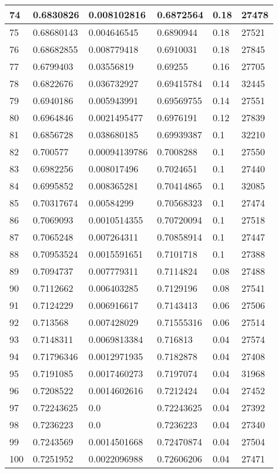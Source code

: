 \begin{longtable}{|l|l|l|l|l|l|}
74 & 0.6830826 & 0.008102816 & 0.6872564 & 0.18 & 27478 \\ \hline 
75 & 0.68680143 & 0.004646545 & 0.6890944 & 0.18 & 27521 \\ \hline 
76 & 0.68682855 & 0.008779418 & 0.6910031 & 0.18 & 27845 \\ \hline 
77 & 0.6799403 & 0.03556819 & 0.69255 & 0.16 & 27705 \\ \hline 
78 & 0.6822676 & 0.036732927 & 0.69415784 & 0.14 & 32445 \\ \hline 
79 & 0.6940186 & 0.005943991 & 0.69569755 & 0.14 & 27551 \\ \hline 
80 & 0.6964846 & 0.0021495477 & 0.6976191 & 0.12 & 27839 \\ \hline 
81 & 0.6856728 & 0.038680185 & 0.69939387 & 0.1 & 32210 \\ \hline 
82 & 0.700577 & 0.00094139786 & 0.7008288 & 0.1 & 27550 \\ \hline 
83 & 0.6982256 & 0.008017496 & 0.7024651 & 0.1 & 27440 \\ \hline 
84 & 0.6995852 & 0.008365281 & 0.70414865 & 0.1 & 32085 \\ \hline 
85 & 0.70317674 & 0.00584299 & 0.70568323 & 0.1 & 27474 \\ \hline 
86 & 0.7069093 & 0.0010514355 & 0.70720094 & 0.1 & 27518 \\ \hline 
87 & 0.7065248 & 0.007264311 & 0.70858914 & 0.1 & 27447 \\ \hline 
88 & 0.70953524 & 0.0015591651 & 0.7101718 & 0.1 & 27388 \\ \hline 
89 & 0.7094737 & 0.007779311 & 0.7114824 & 0.08 & 27488 \\ \hline 
90 & 0.7112662 & 0.006403285 & 0.7129196 & 0.08 & 27541 \\ \hline 
91 & 0.7124229 & 0.006916617 & 0.7143413 & 0.06 & 27506 \\ \hline 
92 & 0.713568 & 0.007428029 & 0.71555316 & 0.06 & 27514 \\ \hline 
93 & 0.7148311 & 0.0069813384 & 0.716813 & 0.04 & 27574 \\ \hline 
94 & 0.71796346 & 0.0012971935 & 0.7182878 & 0.04 & 27408 \\ \hline 
95 & 0.7191085 & 0.0017460273 & 0.7197074 & 0.04 & 31968 \\ \hline 
96 & 0.7208522 & 0.0014602616 & 0.7212424 & 0.04 & 27452 \\ \hline 
97 & 0.72243625 & 0.0 & 0.72243625 & 0.04 & 27392 \\ \hline 
98 & 0.7236223 & 0.0 & 0.7236223 & 0.04 & 27340 \\ \hline 
99 & 0.7243569 & 0.0014501668 & 0.72470874 & 0.04 & 27504 \\ \hline 
100 & 0.7251952 & 0.0022096988 & 0.72606206 & 0.04 & 27471 \\ \hline 
\end{longtable}